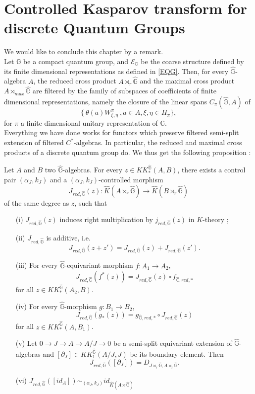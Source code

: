 \section{Controlled Kasparov transform for discrete Quantum Groups}

We would like to conclude this chapter by a remark. \\

Let $\mathbb G$ be a compact quantum group, and $\mathcal E_{\mathbb G}$ be the coarse structure defined by its finite dimensional representations as defined in \ref{EQG}. Then, for every $\hat{\mathbb G}$-algebra $A$, the reduced cross product $A\rtimes_r \hat{\mathbb G}$ and the maximal cross product $A\rtimes_{max}\hat{\mathbb G}$ are filtered by the family of subspaces of coefficients of finite dimensional representations, namely the closure of the linear spans $C_{\pi}(\hat{\mathbb G},A)$ of
\[\{ \ \theta(a)W^\pi_{\xi,\eta} \ , a\in A, \xi,\eta\in H_\pi\},\]
for $\pi$ a finite dimensional unitary representation of $\mathbb G$.\\

Everything we have done works for functors which preserve filtered semi-split extension of filtered $C^*$-algebras. In particular, the reduced and maximal cross products of a discrete quantum group do. We thus get the following proposition :

\begin{prop}
Let $A$ and $B$ two $\hat{\mathbb G}$-algebras. For every $z\in KK^{\hat{\mathbb G}}_*(A,B)$, there exists a control pair $(\alpha_J,k_J)$ and a $(\alpha_J,k_J)$-controlled morphism
\[J_{red,\hat{\mathbb G}}(z) : \hat K(A\rtimes_r \hat{\mathbb G})\rightarrow \hat K(B\rtimes_r \hat{\mathbb G})\]
of the same degree as $z$, such that
\begin{enumerate}
\item[(i)] $J_{red,\hat{\mathbb G}}(z)$ induces right multiplication by $j_{red,\hat{\mathbb G}}(z)$ in $K$-theory ;
\item[(ii)] $J_{red,\hat{\mathbb G}}$ is additive, i.e.
\[J_{red,\hat{\mathbb G}}(z+z')=J_{red,\hat{\mathbb G}}(z)+J_{red,\hat{\mathbb G}}(z').\]
\item[(iii)] For every $\hat{\mathbb G}$-equivariant morphism $f : A_1\rightarrow A_2$,
\[J_{red,\hat{\mathbb G}}(f^*(z))=J_{red,\hat{\mathbb G}}(z)\circ f_{\hat{\mathbb G},red,*}\] for all $z\in KK_*^{\hat{\mathbb G}}(A_2,B)$.
\item[(iv)] For every $\hat{\mathbb G}$-morphism $g : B_1\rightarrow B_2$,
\[J_{red,\hat{\mathbb G}}(g_*(z))= g_{\hat{\mathbb G},red,*}\circ J_{red,\hat{\mathbb G}}(z)\] for all $z\in KK_*^{\hat{\mathbb G}}(A,B_1)$.
\item[(v)] Let $0\rightarrow J\rightarrow A\rightarrow A/J\rightarrow 0$ be a semi-split equivariant extension of $\hat{\mathbb G}$-algebras and $[\partial_J]\in KK_1^{\hat{\mathbb G}}(A/J,J)$ be its boundary element. Then 
\[J_{red,\hat{\mathbb G}}([\partial_J])=D_{J\rtimes_r \hat{\mathbb G},A\rtimes_r \hat{\mathbb G}}.\] 
\item[(vi)] $J_{red,\hat{\mathbb G}}([id_A]) \sim_{(\alpha_J,k_J)} id_{\hat K(A\rtimes \hat{\mathbb G})}$
\end{enumerate}
\end{prop}


